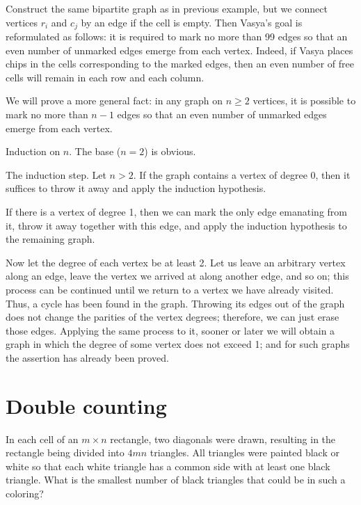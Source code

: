 Construct the same bipartite graph as in previous example, but we connect vertices $r_i$ and $c_j$ by an edge if the cell is empty. Then Vasya's goal is reformulated as follows: it is required to mark no more than 99 edges so that an even number of unmarked edges emerge from each vertex. Indeed, if Vasya places chips in the cells corresponding to the marked edges, then an even number of free cells will remain in each row and each column.

We will prove a more general fact: in any graph on $n\geq2$ vertices, it is possible to mark no more than $n-1$ edges so that an even number of unmarked edges emerge from each vertex.

Induction on $n$. The base ($n = 2$) is obvious.

The induction step. Let $n>2$. If the graph contains a vertex of degree 0, then it suffices to throw it away and apply the induction hypothesis.

If there is a vertex of degree 1, then we can mark the only edge emanating from it, throw it away together with this edge, and apply the induction hypothesis to the remaining graph.

Now let the degree of each vertex be at least 2. Let us leave an arbitrary vertex along an edge, leave the vertex we arrived at along another edge, and so on; this process can be continued until we return to a vertex we have already visited. Thus, a cycle has been found in the graph. Throwing its edges out of the graph does not change the parities of the vertex degrees; therefore, we can just erase those edges. Applying the same process to it, sooner or later we will obtain a graph in which the degree of some vertex does not exceed 1; and for such graphs the assertion has already been proved.

\newpage

\section{Double counting}

\begin{example} 
    In each cell of an $m\times n$ rectangle, two diagonals were drawn, resulting in the rectangle being divided into $4mn$ triangles. All triangles were painted black or white so that each white triangle has a common side with at least one black triangle. What is the smallest number of black triangles that could be in such a coloring?
\end{example}

